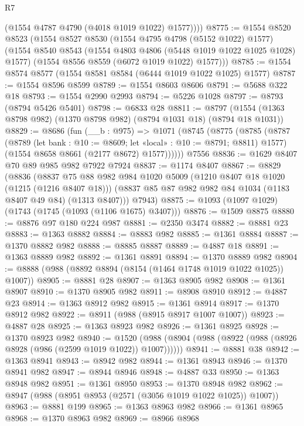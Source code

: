 \begin{lexlean}{R7}
\begin{coremodule}
          (@1554 @4787 @4790 (@4018 @1019 @1022) @1577))))
@8775 := @1554
    @8520
    @8523
    (@1554
      @8527
      @8530
      (@1554 @4795 @4798 (@5152 @1022) @1577)
      (@1554
        @8540
        @8543
        (@1554 @4803 @4806 (@5448 @1019 @1022 @1025 @1028) @1577)
        (@1554 @8556 @8559 (@6072 @1019 @1022) @1577)))
@8785 := @1554 @8574 @8577 (@1554 @8581 @8584 (@6444 @1019 @1022 @1025) @1577)
@8787 := @1554 @8596 @8599
@8789 := @1554 @8603 @8606
@8791 := @5688 @322 @18
@8793 := @1554 @2990 @2993
@8794 := @5226 @1028
@8797 := @8793 (@8794 @5426 @5401)
@8798 := @6833 @28
@8811 := @8797 (@1554 (@1363 @8798 @982) (@1370 @8798 @982) (@8794 @1031 @18) (@8794 @18 @1031))
@8829 := @8686
    (fun (__b : @975) =>
    @1071
      (@8745
        (@8775
          (@8785
            (@8787
              (@8789 (let bank : @10 := @8609; let «local» : @10 := @8791; @8811) @1577)
              (@1554 @8658 @8661 (@2177 @8672) @1577))))))
    @7556
@8836 := @1629 @8407 @70 @89 @985 @982 @7922 @7924
@8837 := @1174 @8407
@8867 := @8829
    (@8836
      (@8837
        @75
        @88
        @982
        @984
        @1020
        @5009
        (@1210 @8407 @18 @1020 (@1215 (@1216 @8407 @18)))
        (@8837 @85 @87 @982 @982 @84 @1034 (@1183 @8407 @49 @84) (@1313 @8407)))
      @7943)
@8875 := @1093 (@1097 @1029) (@1743 (@1745 (@1093 (@1106 @1675) @3407)))
@8876 := @1509 @8875
@8880 := @8876 @97 @180 @224 @987
@8881 := @2350 @3474
@8882 := @8881 @23
@8883 := @1363 @8882
@8884 := @8883 @982
@8885 := @1361 @8884
@8887 := @1370 @8882 @982
@8888 := @8885 @8887
@8889 := @4887 @18
@8891 := @1363 @8889 @982
@8892 := @1361 @8891
@8894 := @1370 @8889 @982
@8904 := @8888 (@988 (@8892 @8894 (@8154 (@1464 @1748 @1019 @1022 @1025)) @1007))
@8905 := @8881 @28
@8907 := @1363 @8905 @982
@8908 := @1361 @8907
@8910 := @1370 @8905 @982
@8911 := @8908 @8910
@8912 := @4887 @23
@8914 := @1363 @8912 @982
@8915 := @1361 @8914
@8917 := @1370 @8912 @982
@8922 := @8911 (@988 (@8915 @8917 @1007 @1007))
@8923 := @4887 @28
@8925 := @1363 @8923 @982
@8926 := @1361 @8925
@8928 := @1370 @8923 @982
@8940 := @1520 (@988 (@8904 (@988 (@8922 (@988 (@8926 @8928 (@986 (@2599 @1019 @1022)) @1007))))))
@8941 := @8881 @38
@8942 := @1363 @8941
@8943 := @8942 @982
@8944 := @1361 @8943
@8946 := @1370 @8941 @982
@8947 := @8944 @8946
@8948 := @4887 @33
@8950 := @1363 @8948 @982
@8951 := @1361 @8950
@8953 := @1370 @8948 @982
@8962 := @8947 (@988 (@8951 @8953 (@2571 (@3056 @1019 @1022 @1025)) @1007))
@8963 := @8881 @199
@8965 := @1363 @8963 @982
@8966 := @1361 @8965
@8968 := @1370 @8963 @982
@8969 := @8966 @8968

\end{coremodule}
\end{lexlean}
